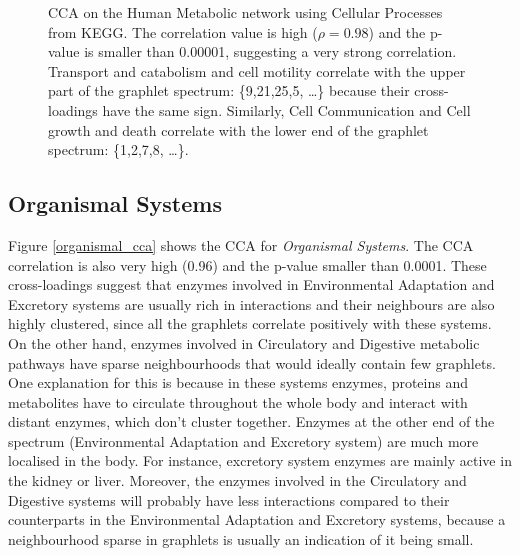 \begin{figure}
\begin{subfigure}{.65\textwidth}
  \end{subfigure}
  \begin{subfigure}{.25\textwidth}
    \centering 
	
    \gnine
    \gtwentyone
    \gtwentyfive
    \gdots
    \gseven
    \gtwo
    \gone

  \end{subfigure}
  
\caption[CCA on the Human Metabolic network using Cellular Processes from KEGG]{CCA on the Human Metabolic network using Cellular Processes from KEGG. The correlation value is high ($\rho = 0.98$) and the p-value is smaller than 0.00001, suggesting a very strong correlation. Transport and catabolism and cell motility correlate with the upper part of the graphlet spectrum: \{9,21,25,5, \dots\} because their cross-loadings have the same sign. Similarly, Cell Communication and Cell growth and death correlate with the lower end of the graphlet spectrum: \{1,2,7,8, \dots\}. }
\label{cellular_cca}
\end{figure}



\subsection{Organismal Systems}
\label{cca_kegg_organismal}

Figure \ref{organismal_cca} shows the CCA for \emph{Organismal Systems}. The CCA correlation is also very high (0.96) and the p-value smaller than 0.0001. These cross-loadings suggest that enzymes involved in Environmental Adaptation and Excretory systems are usually rich in interactions and their neighbours are also highly clustered, since all the graphlets correlate positively with these systems. On the other hand, enzymes involved in Circulatory and Digestive metabolic pathways have sparse  neighbourhoods that would ideally contain few graphlets. One explanation for this is because in these systems enzymes, proteins and metabolites have to circulate throughout the whole body and interact with distant enzymes, which don't cluster together. Enzymes at the other end of the spectrum (Environmental Adaptation and Excretory system) are much more localised in the body. For instance, excretory system enzymes are mainly active in the kidney or liver. Moreover, the enzymes involved in the Circulatory and Digestive 
systems will probably have less interactions compared to their counterparts in the Environmental Adaptation and Excretory systems, because a neighbourhood sparse in graphlets is usually an indication of it being small.



